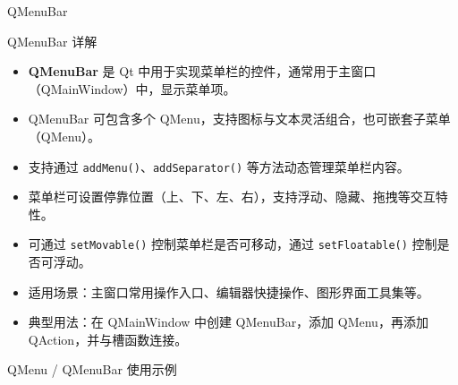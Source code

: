 \documentclass[UTF8,aspectratio=169]{beamer}
\begin{document}
\begin{frame}{QMenuBar}
    \begin{ytublock}{QMenuBar 详解}
        \begin{itemize}
            \item \textbf{QMenuBar} 是 Qt 中用于实现菜单栏的控件，通常用于主窗口（QMainWindow）中，显示菜单项。
            \item QMenuBar 可包含多个 QMenu，支持图标与文本灵活组合，也可嵌套子菜单（QMenu）。
            \item 支持通过 \texttt{addMenu()}、\texttt{addSeparator()} 等方法动态管理菜单栏内容。
            \item 菜单栏可设置停靠位置（上、下、左、右），支持浮动、隐藏、拖拽等交互特性。
            \item 可通过 \texttt{setMovable()} 控制菜单栏是否可移动，通过 \texttt{setFloatable()} 控制是否可浮动。
            \item 适用场景：主窗口常用操作入口、编辑器快捷操作、图形界面工具集等。
            \item 典型用法：在 QMainWindow 中创建 QMenuBar，添加 QMenu，再添加 QAction，并与槽函数连接。
        \end{itemize}
    \end{ytublock}
\end{frame}

\begin{frame}[fragile]{QMenu / QMenuBar 使用示例}
    \begin{columns}
        \begin{column}{0.48\textwidth}
            \inputminted[firstline=1,lastline=19]{cpp}{code/qt_menu_example.cpp}
        \end{column}
        \begin{column}{0.48\textwidth}
            \inputminted[firstline=20,lastline=38]{cpp}{code/qt_menu_example.cpp}
        \end{column}
    \end{columns}
\end{frame}
\end{document}
